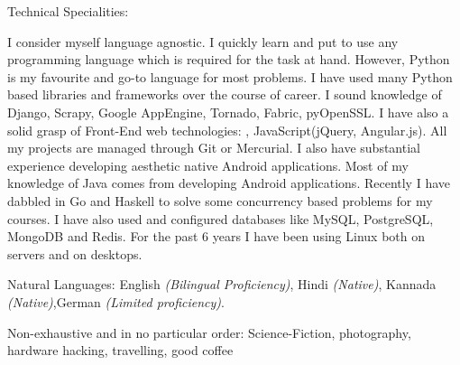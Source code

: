 \documentclass[10pt,a4paper]{article}
\begin{document}
\spacedhrule{0.5em}{-0.4em}


\inlineheadsection  %
  {Technical Specialities:}
  {I consider myself language agnostic. I quickly learn and put to use any programming language which is required for the task at hand. However, Python is my favourite and go-to language for most problems. I have used many Python based libraries and frameworks over the course of career. I sound knowledge of Django, Scrapy, Google AppEngine, Tornado, Fabric, pyOpenSSL. I have also a solid grasp of Front-End web technologies: , JavaScript(jQuery, Angular.js). All my projects are managed through Git or Mercurial. I also have substantial experience developing aesthetic native Android applications. Most of my knowledge of Java comes from developing Android applications. Recently I have dabbled in Go and Haskell to solve some concurrency based problems for my courses. I have also used and configured databases like MySQL, PostgreSQL, MongoDB and Redis. For the past 6 years I have been using Linux both on servers and on desktops.

}

\inlineheadsection
  {Natural Languages:}
  {English \emph{(Bilingual Proficiency)}, Hindi \emph{(Native)}, Kannada \emph{(Native)},German \emph{(Limited proficiency)}.}


\spacedhrule{1.6em}{-0.4em}


\inlineheadsection
  {Non-exhaustive and in no particular order:}
  {Science-Fiction, photography, hardware hacking, travelling, good coffee}
\end{document}
